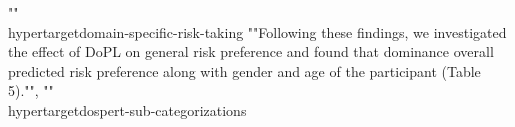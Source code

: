 {{{{{{{{{{{{{{{{""\\hypertarget{domain-specific-risk-taking}{%
""Following these findings, we investigated the effect of DoPL on general risk preference and found that dominance overall predicted risk preference along with gender and age of the participant (Table 5)."", ""\\hypertarget{dospert-sub-categorizations}{%
}}}}}}}}}}}}}}}}}}
